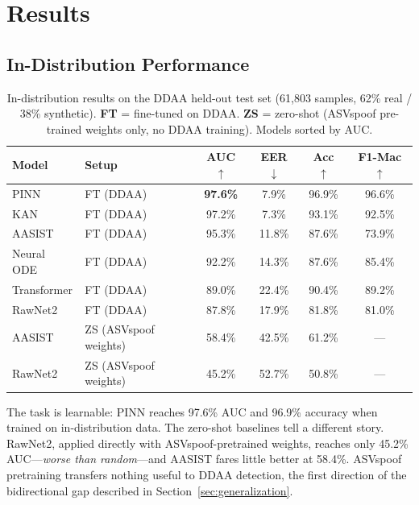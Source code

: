 \documentclass{article}
\newcommand{\ddaa}{\textsc{DDAA}}
\begin{document}
\section{Results}
\label{sec:results}

\subsection{In-Distribution Performance}

\begin{table}[ht]
  \caption{In-distribution results on the \ddaa{} held-out test set
  (61,803 samples, 62\% real / 38\% synthetic).
  \textbf{FT} = fine-tuned on \ddaa{}. \textbf{ZS} = zero-shot
  (ASVspoof pre-trained weights only, no \ddaa{} training).
  Models sorted by AUC.}
  \label{tab:t1}
  \centering
  \setlength{\tabcolsep}{5.5pt}
  \begin{tabular}{llcccc}
    \toprule
    Model & Setup & AUC $\uparrow$ & EER $\downarrow$ &
      Acc $\uparrow$ & F1-Mac $\uparrow$ \\
    \midrule
    PINN        & FT (\ddaa)             & \textbf{97.6\%} & 7.9\%  & 96.9\% & 96.6\% \\
    KAN         & FT (\ddaa)             & 97.2\%          & 7.3\%  & 93.1\% & 92.5\% \\
    AASIST      & FT (\ddaa)             & 95.3\%          & 11.8\% & 87.6\% & 73.9\% \\
    Neural ODE  & FT (\ddaa)             & 92.2\%          & 14.3\% & 87.6\% & 85.4\% \\
    Transformer & FT (\ddaa)             & 89.0\%          & 22.4\% & 90.4\% & 89.2\% \\
    RawNet2     & FT (\ddaa)             & 87.8\%          & 17.9\% & 81.8\% & 81.0\% \\
    \midrule
    AASIST      & ZS (ASVspoof weights)  & 58.4\%          & 42.5\% & 61.2\% & ---    \\
    RawNet2     & ZS (ASVspoof weights)  & 45.2\%          & 52.7\% & 50.8\% & ---    \\
    \bottomrule
  \end{tabular}
\end{table}

The task is learnable: PINN reaches 97.6\% AUC and 96.9\% accuracy when
trained on in-distribution data.  The zero-shot baselines tell a different
story.  RawNet2, applied directly with ASVspoof-pretrained weights, reaches
only 45.2\% AUC---\emph{worse than random}---and AASIST fares little better at
58.4\%.  ASVspoof pretraining transfers nothing useful to \ddaa{} detection,
the first direction of the bidirectional gap described in Section~\ref{sec:generalization}.
\end{document}
